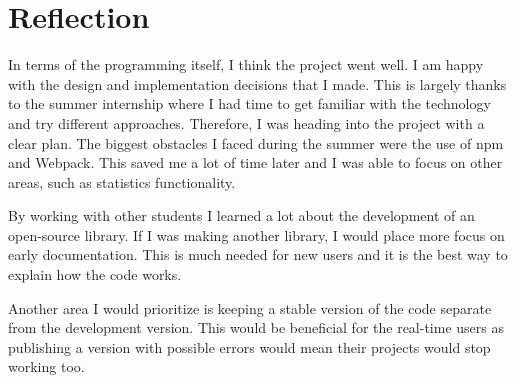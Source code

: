 \documentclass{l4proj}
\begin{document}
\section{Reflection}
In terms of the programming itself, I think the project went well. I am happy with the design and implementation decisions that I made. This is largely thanks to the summer internship where I had time to get familiar with the technology and try different approaches. Therefore, I was heading into the project with a clear plan. The biggest obstacles I faced during the summer were the use of npm and Webpack. This saved me a lot of time later and I was able to focus on other areas, such as statistics functionality. \par
By working with other students I learned a lot about the development of an open-source library. If I was making another library, I would place more focus on early documentation. This is much needed for new users and it is the best way to explain how the code works. \par 
Another area I would prioritize is keeping a stable version of the code separate from the development version. This would be beneficial for the real-time users as publishing a version with possible errors would mean their projects would stop working too. \par
\end{document}

